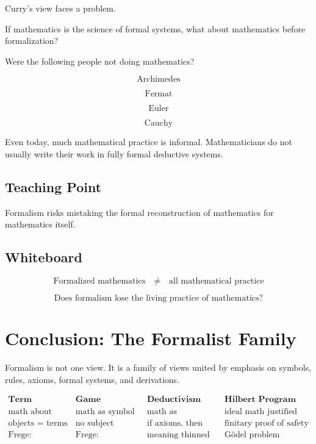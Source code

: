 \documentclass[11pt]{article}
\begin{document}
Curry's view faces a problem.

If mathematics is the science of formal systems, what about mathematics before
formalization?

Were the following people not doing mathematics?

\[
\text{Archimedes}
\]

\[
\text{Fermat}
\]

\[
\text{Euler}
\]

\[
\text{Cauchy}
\]

Even today, much mathematical practice is informal. Mathematicians do not usually write
their work in fully formal deductive systems.

\subsection*{Teaching Point}

Formalism risks mistaking the formal reconstruction of mathematics for mathematics
itself.

\subsection*{Whiteboard}

\[
\text{Formalized mathematics}
\quad \neq
\quad
\text{all mathematical practice}
\]

\[
\text{Does formalism lose the living practice of mathematics?}
\]

\section*{Conclusion: The Formalist Family}

Formalism is not one view. It is a family of views united by emphasis on symbols, rules,
axioms, formal systems, and derivations.

\[
\begin{array}{c|c|c|c}
\textbf{Term Formalism} & \textbf{Game Formalism} & \textbf{Deductivism} & \textbf{Hilbert Program} \\
\hline
\text{math about symbols} &
\text{math as symbol game} &
\text{math as consequence} &
\text{ideal math justified by consistency} \\
\text{objects = terms} &
\text{no subject matter} &
\text{if axioms, then theorem} &
\text{finitary proof of safety} \\
\text{Frege: equations fail} &
\text{Frege: application fails} &
\text{meaning thinned out} &
\text{G\"odel problem}
\end{array}
\]
\end{document}
